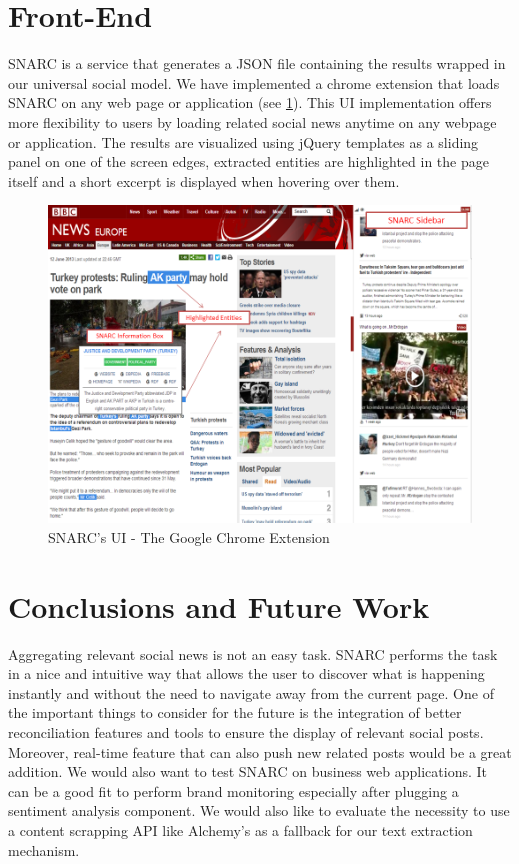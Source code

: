 \documentclass[oribibl]{llncs}
\begin{document}

\section{Front-End}
SNARC is a service that generates a JSON file containing the results wrapped in our universal social model. We have implemented a chrome extension that loads SNARC on any web page or application (see \ref{fig:4}). This UI implementation offers more flexibility to users by loading related social news anytime on any webpage or application. The results are visualized using jQuery templates as a sliding panel on one of the screen edges, extracted entities are highlighted in the page itself and a short excerpt is displayed when hovering over them.
\begin{figure}[h!]
  \centering
    \includegraphics[scale=0.45]{SNARC-annotated.png}
  \caption{SNARC's UI - The Google Chrome Extension}
  \label{fig:4}
\end{figure}



\section{Conclusions and Future Work}
Aggregating relevant social news is not an easy task. SNARC performs the task in a nice and intuitive way that allows the user to discover what is happening instantly and without the need to navigate away from the current page. One of the important things to consider for the future is the integration of better reconciliation features and tools to ensure the display of relevant social posts. Moreover, real-time feature that can also push new related posts would be a great addition. We would also want to test SNARC on business web applications. It can be a good fit to perform brand monitoring especially after plugging a sentiment analysis component. We would also like to evaluate the necessity to use a content scrapping API like Alchemy’s as a fallback for our text extraction mechanism.



\end{document}
